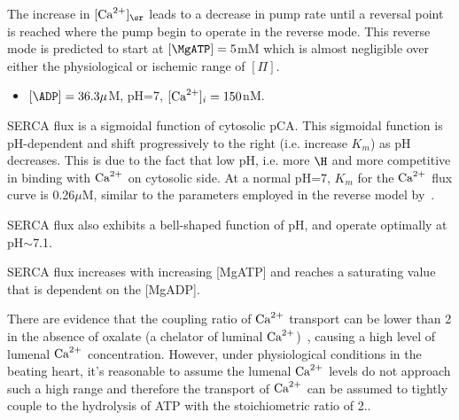 The increase in $[\Ca]_\sr$ leads to a decrease in pump rate until a
reversal point is reached where the pump begin to operate in the
reverse mode. This reverse mode is predicted to start at
$[\MgATP]=5$mM which is almost negligible over either the
physiological or ischemic range of $[\Pi]$.
\begin{itemize}
\item $[\ADP]=36.3\mu$M, pH=7, $[{\text{Ca}^{2+}}]_i=150$nM. 
\end{itemize}

SERCA flux is a sigmoidal function of cytosolic pCA. This sigmoidal
function is pH-dependent and shift progressively to the right
(i.e. increase $K_m$) as pH decreases. This is due to the fact that
low pH, i.e. more $\H$ and more competitive in binding with ${\text{Ca}^{2+}}$ on
cytosolic side. At a normal pH=7, $K_m$ for the ${\text{Ca}^{2+}}$ flux curve is
0.26$\mu$M, similar to the parameters employed in the reverse model
by~\citep{shannon2000rms}.

SERCA flux also exhibits a bell-shaped function of pH, and operate
optimally at pH$\sim$7.1.

SERCA flux increases with increasing [MgATP] and reaches a saturating
value that is dependent on the [MgADP].

There are evidence that the coupling ratio of ${\text{Ca}^{2+}}$ transport can be
lower than 2 in the absence of oxalate (a chelator of luminal
${\text{Ca}^{2+}}$)~\citep{yu1995}, causing a high level of lumenal ${\text{Ca}^{2+}}$
concentration. However, under physiological conditions in the beating
heart, it's reasonable to assume the lumenal ${\text{Ca}^{2+}}$ levels do not
approach such a high range and therefore the transport of ${\text{Ca}^{2+}}$ can be
assumed to tightly couple to the hydrolysis of ATP with the
stoichiometric ratio of 2..



